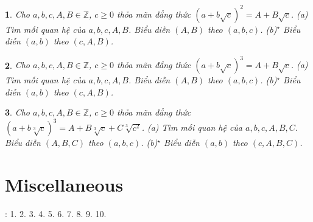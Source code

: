 \documentclass{article}
\newtheorem{baitoan}{}%
\begin{document}
\begin{baitoan}
	Cho $a,b,c,A,B\in\mathbb{Z}$, $c\ge0$ thỏa mãn đẳng thức $(a + b\sqrt{c})^2 = A + B\sqrt{c}$. (a) Tìm mối quan hệ của $a,b,c,A,B$. Biểu diễn $(A,B)$ theo $(a,b,c)$. (b)${}^\star$ Biểu diễn $(a,b)$ theo $(c,A,B)$.
\end{baitoan}

\begin{baitoan}
	Cho $a,b,c,A,B\in\mathbb{Z}$, $c\ge0$ thỏa mãn đẳng thức $(a + b\sqrt{c})^3 = A + B\sqrt{c}$. (a) Tìm mối quan hệ của $a,b,c,A,B$. Biểu diễn $(A,B)$ theo $(a,b,c)$. (b)${}^\star$ Biểu diễn $(a,b)$ theo $(c,A,B)$.
\end{baitoan}

\begin{baitoan}
	Cho $a,b,c,A,B\in\mathbb{Z}$, $c\ge0$ thỏa mãn đẳng thức $(a + b\sqrt[3]{c})^3 = A + B\sqrt[3]{c} + C\sqrt[3]{c^2}$. (a) Tìm mối quan hệ của $a,b,c,A,B,C$. Biểu diễn $(A,B,C)$ theo $(a,b,c)$. (b)${}^\star$ Biểu diễn $(a,b)$ theo $(c,A,B,C)$.
\end{baitoan}


\section{Miscellaneous}
\cite[BTCCIII, pp. 72--73]{SGK_Toan_9_Canh_Dieu_tap_1}: 1. 2. 3. 4. 5. 6. 7. 8. 9. 10.


\printbibliography[heading=bibintoc]
\end{document}
